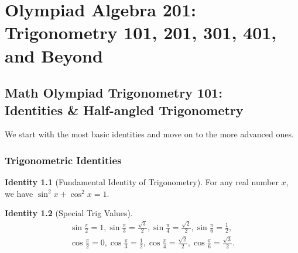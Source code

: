 \documentclass[12pt,a4paper]{memoir}
\theoremstyle{definition}
\newtheorem{identity}{Identity}
\begin{document}
\chapter{Olympiad Algebra 201:\\ Trigonometry 101, 201, 301, 401, and Beyond}
% 

\section{Math Olympiad Trigonometry 101:\\ Identities \& Half-angled Trigonometry}
We start with the most basic identities and move on to the more advanced ones.
\subsection{Trigonometric Identities}

\begin{identity}[Fundamental Identity of Trigonometry]
	For any real number $x$, we have $\sin^2 x + \cos^2 x = 1$.
\end{identity}

\begin{identity}[Special Trig Values]
	\begin{align}
		\sin \frac{\pi}2 = 1,  \sin \frac{\pi}3 = \frac{\sqrt 3}{2}, \sin \frac{\pi}4 = \frac{\sqrt 2}{2}, \sin \frac{\pi}{6} = \frac 12,\\
		\cos \frac{\pi}2 = 0,  \cos \frac{\pi}3 = \frac{1}{2}, \cos \frac{\pi}4 = \frac{\sqrt 2}{2}, \cos \frac{\pi}{6} = \frac{\sqrt 3}2.
	\end{align}
\end{identity}
\end{document}
